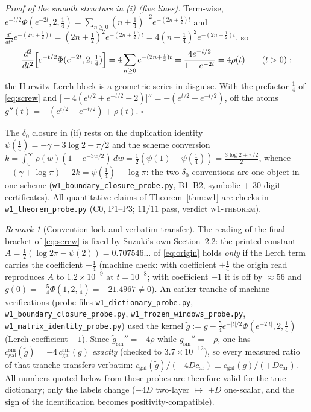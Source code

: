 \documentclass[11pt,a4paper]{article}
\theoremstyle{remark}
\newtheorem{remark}[theorem]{Remark}
\begin{document}
\emph{Proof of the smooth structure in (i) (five lines).}  Term-wise,
$e^{-t/2}\Phi(e^{-2t},2,\tfrac14)=\sum_{n\ge0}(n+\tfrac14)^{-2}
e^{-(2n+\frac12)t}$ and
$\frac{d^2}{dt^2}e^{-(2n+\frac12)t}
=(2n+\tfrac12)^2e^{-(2n+\frac12)t}
=4(n+\tfrac14)^2e^{-(2n+\frac12)t}$, so
\begin{equation}\label{eq:collapse}
\frac{d^2}{dt^2}\Bigl[e^{-t/2}\Phi(e^{-2t},2,\tfrac14)\Bigr]
=4\sum_{n\ge0}e^{-(2n+\frac12)t}=\frac{4e^{-t/2}}{1-e^{-2t}}=4\rho(t)
\qquad(t>0):
\end{equation}
the Hurwitz--Lerch block is a geometric series in disguise.  With the
prefactor $\tfrac14$ of \eqref{eq:screw} and
$\bigl[-4(e^{t/2}+e^{-t/2}-2)\bigr]''=-(e^{t/2}+e^{-t/2})$, off the
atoms $g''(t)=-(e^{t/2}+e^{-t/2})+\rho(t)$. \hfill$\square$

The $\delta_0$ closure in (ii) rests on the duplication identity
$\psi(\tfrac14)=-\gamma-3\log2-\pi/2$ and the scheme conversion
$k=\int_0^\infty\rho(w)(1-e^{-3w/2})\,dw
=\tfrac12(\psi(1)-\psi(\tfrac14))=\tfrac{3\log2+\pi/2}2$, whence
$-(\gamma+\log\pi)-2k=\psi(\tfrac14)-\log\pi$: the two $\delta_0$
conventions are one object in one scheme
(\texttt{w1\_boundary\_closure\_probe.py}, B1--B2, symbolic + $30$-digit
certificates).  All quantitative claims of
Theorem~\ref{thm:w1} are checks in \texttt{w1\_theorem\_probe.py}
(C0, P1--P3; $11/11$ pass, verdict \textsc{w1-theorem}).

\begin{remark}[Convention lock and verbatim transfer]
\label{rem:convention}
The reading of the final bracket of \eqref{eq:screw} is fixed by
Suzuki's own Section~2.2: the printed constant
$A=\tfrac12(\log2\pi-\psi(2))=0.707546\ldots$ of \eqref{eq:origin}
holds \emph{only} if the Lerch term carries the coefficient $+\tfrac14$
(machine check: with coefficient $+\tfrac14$ the origin read
reproduces $A$ to $1.2\times10^{-9}$ at $t=10^{-8}$; with coefficient
$-1$ it is off by $\approx56$ and $g(0)=-\tfrac54\Phi(1,2,\tfrac14)
=-21.4967\neq0$).  An earlier tranche of machine verifications (probe
files \texttt{w1\_dictionary\_probe.py},
\texttt{w1\_boundary\_closure\_probe.py},
\texttt{w1\_frozen\_windows\_probe.py},
\texttt{w1\_matrix\_identity\_probe.py}) used the kernel
$\tilde g:=g-\tfrac54e^{-|t|/2}\Phi(e^{-2|t|},2,\tfrac14)$ (Lerch
coefficient $-1$).  Since
$\tilde g_{\mathrm{sm}}''=-4\rho$ while $g_{\mathrm{sm}}''=+\rho$, one
has $c_{\mathrm{gal}}^{\mathrm{sm}}(\tilde g)
=-4\,c_{\mathrm{gal}}^{\mathrm{sm}}(g)$ \emph{exactly} (checked to
$3.7\times10^{-12}$), so every measured ratio of that tranche transfers
verbatim:
$c_{\mathrm{gal}}(\tilde g)/(-4Dc_{\mathrm{ar}})
\equiv c_{\mathrm{gal}}(g)/(+Dc_{\mathrm{ar}})$.  All numbers quoted
below from those probes are therefore valid for the true dictionary;
only the labels change ($-4D$ two-layer $\mapsto$ $+D$ one-scalar, and
the sign of the identification becomes positivity-compatible).
\end{remark}
\end{document}
